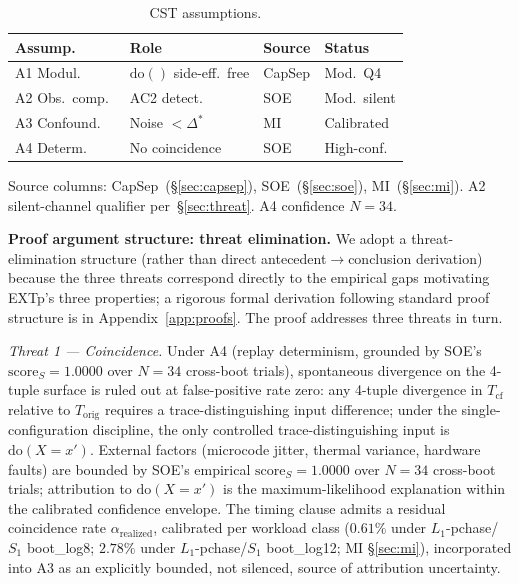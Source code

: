\documentclass[conference]{IEEEtran}
\newcommand{\Korig}{T_\text{orig}}
\newcommand{\Tcf}{T_\text{cf}}
\newcommand{\Dstar}{\Delta^{*}}
\newcommand{\arealized}{\alpha_\text{realized}}
\newcommand{\scoreS}{\text{score}_S}
\newcommand{\dox}[1]{\text{do}(X{=}#1)}
\begin{document}
\begin{table}[t]
  \caption{CST assumptions.}
  \label{tab:assumptions}
  \centering
  \small
  \begin{tabular}{@{}p{}p{}p{}p{}@{}}
  \toprule
  Assump.\ & Role & Source & Status \\
  \midrule
  A1 Modul.\           & $\text{do}()$ side-eff.\ free & CapSep
                       & Mod.\ Q4 \\
  A2 Obs.\ comp.\      & AC2 detect.                   & SOE
                       & Mod.\ silent \\
  A3 Confound.\        & Noise $<\Dstar$               & MI
                       & Calibrated \\
  A4 Determ.\          & No coincidence                & SOE
                       & High-conf. \\
  \bottomrule
  \end{tabular}

  \vspace{0.3em}
  \footnotesize{Source columns: CapSep~(\S\ref{sec:capsep}),
  SOE~(\S\ref{sec:soe}), MI~(\S\ref{sec:mi}). A2 silent-channel
  qualifier per~\S\ref{sec:threat}. A4 confidence $N{=}34$.}
\end{table}

\textbf{Proof argument structure: threat elimination.} We adopt a
threat-elimination structure (rather than direct
antecedent$\rightarrow$conclusion derivation) because the three
threats correspond directly to the empirical gaps motivating EXTp's
three properties; a rigorous formal derivation following standard
proof structure is in Appendix~\ref{app:proofs}. The proof addresses
three threats in turn.

\emph{Threat 1 --- Coincidence.} Under A4 (replay determinism,
grounded by SOE's $\scoreS = 1.0000$ over $N{=}34$ cross-boot
trials), spontaneous divergence on the 4-tuple surface is ruled out
at false-positive rate zero: any 4-tuple divergence in $\Tcf$
relative to $\Korig$ requires a trace-distinguishing input
difference; under the single-configuration discipline, the only
controlled trace-distinguishing input is $\dox{x'}$. External
factors (microcode jitter, thermal variance, hardware faults) are
bounded by SOE's empirical $\scoreS = 1.0000$ over $N{=}34$
cross-boot trials; attribution to $\dox{x'}$ is the
maximum-likelihood explanation within the calibrated confidence
envelope. The timing clause admits a residual coincidence rate
$\arealized$, calibrated per workload class ($0.61\%$ under
$L_1$-pchase/$S_1$ boot\_log8; $2.78\%$ under $L_1$-pchase/$S_1$
boot\_log12; MI \S\ref{sec:mi}), incorporated into A3 as an
explicitly bounded, not silenced, source of attribution uncertainty.
\end{document}
